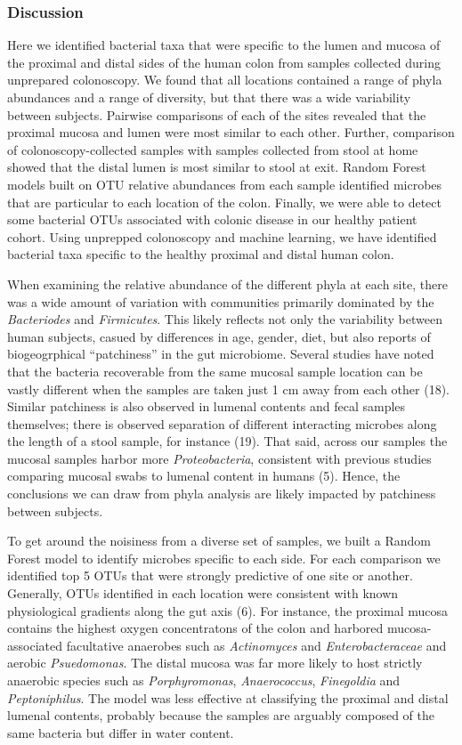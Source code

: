 \documentclass[11pt,]{article}
\begin{document}
\subsubsection{Discussion}\label{discussion}

Here we identified bacterial taxa that were specific to the lumen and
mucosa of the proximal and distal sides of the human colon from samples
collected during unprepared colonoscopy. We found that all locations
contained a range of phyla abundances and a range of diversity, but that
there was a wide variability between subjects. Pairwise comparisons of
each of the sites revealed that the proximal mucosa and lumen were most
similar to each other. Further, comparison of colonoscopy-collected
samples with samples collected from stool at home showed that the distal
lumen is most similar to stool at exit. Random Forest models built on
OTU relative abundances from each sample identified microbes that are
particular to each location of the colon. Finally, we were able to
detect some bacterial OTUs associated with colonic disease in our
healthy patient cohort. Using unprepped colonoscopy and machine
learning, we have identified bacterial taxa specific to the healthy
proximal and distal human colon.

When examining the relative abundance of the different phyla at each
site, there was a wide amount of variation with communities primarily
dominated by the \emph{Bacteriodes} and \emph{Firmicutes}. This likely
reflects not only the variability between human subjects, casued by
differences in age, gender, diet, but also reports of biogeogrphical
``patchiness'' in the gut microbiome. Several studies have noted that
the bacteria recoverable from the same mucosal sample location can be
vastly different when the samples are taken just 1 cm away from each
other (18). Similar patchiness is also observed in lumenal contents and
fecal samples themselves; there is observed separation of different
interacting microbes along the length of a stool sample, for instance
(19). That said, across our samples the mucosal samples harbor more
\emph{Proteobacteria}, consistent with previous studies comparing
mucosal swabs to lumenal content in humans (5). Hence, the conclusions
we can draw from phyla analysis are likely impacted by patchiness
between subjects.

To get around the noisiness from a diverse set of samples, we built a
Random Forest model to identify microbes specific to each side. For each
comparison we identified top 5 OTUs that were strongly predictive of one
site or another. Generally, OTUs identified in each location were
consistent with known physiological gradients along the gut axis (6).
For instance, the proximal mucosa contains the highest oxygen
concentratons of the colon and harbored mucosa-associated facultative
anaerobes such as \emph{Actinomyces} and \emph{Enterobacteraceae} and
aerobic \emph{Psuedomonas}. The distal mucosa was far more likely to
host strictly anaerobic species such as \emph{Porphyromonas},
\emph{Anaerococcus}, \emph{Finegoldia} and \emph{Peptoniphilus}. The
model was less effective at classifying the proximal and distal lumenal
contents, probably because the samples are arguably composed of the same
bacteria but differ in water content.
\end{document}
